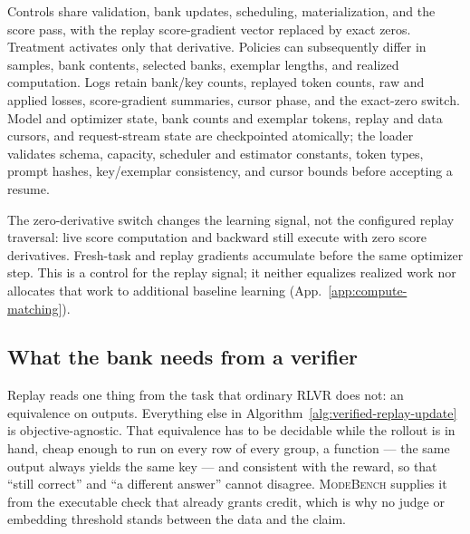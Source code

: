 \documentclass{article}
\newcommand{\1}{\mathbf 1}
\newcommand{\mb}{\textsc{ModeBench}}
\theoremstyle{remark}
\theoremstyle{definition}
\theoremstyle{plain}
\begin{document}
Controls share validation, bank updates, scheduling, materialization, and
the score pass, with the replay score-gradient vector replaced by exact
zeros. Treatment activates only that derivative. Policies can subsequently
differ in samples, bank contents, selected banks, exemplar lengths, and
realized computation. Logs retain bank/key counts, replayed token counts,
raw and applied losses, score-gradient summaries, cursor phase, and the
exact-zero switch. Model and optimizer state, bank counts and exemplar
tokens, replay and data cursors, and request-stream state are checkpointed
atomically; the loader validates schema, capacity, scheduler and estimator
constants, token types, prompt hashes, key/exemplar consistency, and cursor
bounds before accepting a resume.

The zero-derivative switch changes the learning signal, not the configured
replay traversal: live score computation and backward still execute with zero
score derivatives. Fresh-task and replay gradients accumulate before the same
optimizer step. This is a control for the replay signal; it neither equalizes
realized work nor allocates that work to additional baseline learning
(App.~\ref{app:compute-matching}).

\subsection{What the bank needs from a verifier}
\label{app:algorithm-identity}

Replay reads one thing from the task that ordinary RLVR does not: an
equivalence on outputs. Everything else in Algorithm~\ref{alg:verified-replay-update}
is objective-agnostic. That equivalence has to be decidable while the rollout
is in hand, cheap enough to run on every row of every group, a function --- the
same output always yields the same key --- and consistent with the reward, so
that ``still correct'' and ``a different answer'' cannot disagree. \mb{}
supplies it from the executable check that already grants credit, which is why
no judge or embedding threshold stands between the data and the claim.
\end{document}
